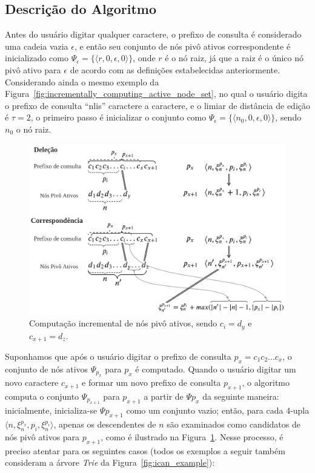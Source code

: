 \subsection{Descrição do Algoritmo}
\label{sec:icpan_algorithm_description}

Antes do usuário digitar qualquer caractere, o prefixo de consulta é considerado uma cadeia vazia $\epsilon$, e então seu conjunto de nós pivô ativos correspondente é inicializado como $\Psi_{\epsilon} = \{ \langle r, 0, \epsilon, 0 \rangle \}$, onde $r$ é o nó raiz, já que a raiz é o único nó pivô ativo para $\epsilon$ de acordo com as definições estabelecidas anteriormente. Considerando ainda o mesmo exemplo da Figura~\ref{fig:incrementally_computing_active_node_set}, no qual o usuário digita o prefixo de consulta ``nlis'' caractere a caractere, e o limiar de distância de edição é $\tau = 2$, o primeiro passo é inicializar o conjunto como $\Psi_{\epsilon} = \{ \langle n_{0}, 0, \epsilon, 0 \rangle \}$, sendo $n_{0}$ o nó raiz. 

\begin{figure}[ht]
    \centering
    \includegraphics[width=1\textwidth]{figures/incrementally_computing_pivotal_nodes.png}
    \caption{Computação incremental de nós pivô ativos, sendo $c_{i} = d_{y}$ e $c_{x+1} = d_{z}$.}
    \label{fig:incrementally_computing_pivotal_nodes}
\end{figure}

Suponhamos que após o usuário digitar o prefixo de consulta $p_{x} = c_{1}c_{2}...c_{x}$, o conjunto de nós ativos $\Psi_{p_{x}}$ para $p_{x}$ é computado. Quando o usuário digitar um novo caractere $c_{x+1}$ e formar um novo prefixo de consulta $p_{x+1}$, o algoritmo computa o conjunto $\Psi_{p_{x+1}}$ para $p_{x+1}$ a partir de $\Psi{p_{x}}$ da seguinte maneira: inicialmente, inicializa-se $\Psi{p_{x+1}}$ como um conjunto vazio; então, para cada 4-upla $ \langle n, \xi_{n}^{p_{x}}, p_{i}, \xi_{n}^{p_{i}} \rangle$, apenas os descendentes de $n$ são examinados como candidatos de nós pivô ativos para $p_{x+1}$, como é ilustrado na Figura~\ref{fig:incrementally_computing_pivotal_nodes}. Nesse processo, é preciso atentar para os seguintes casos (todos os exemplos a seguir também consideram a árvore \textit{Trie} da Figura~\ref{fig:ican_example}):

